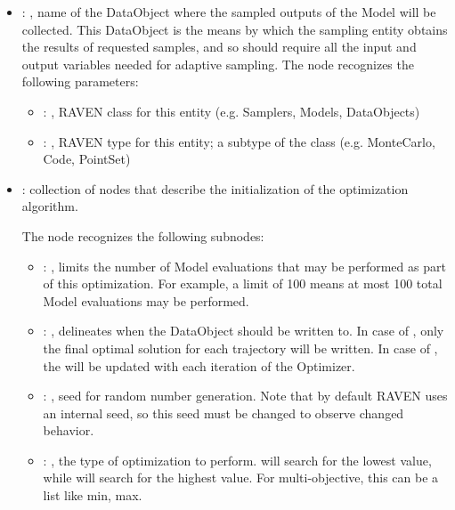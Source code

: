 \begin{itemize}
    \item {}: ,
      name of the DataObject where the sampled outputs of the Model will be collected.
      This DataObject is the means by which the sampling entity obtains the results of requested
      samples, and so should require all the input and output variables needed for adaptive
      sampling.
      The  node recognizes the following parameters:
        \begin{itemize}
          \item {}: ,
            RAVEN class for this entity (e.g. Samplers, Models, DataObjects)
          \item {}: ,
            RAVEN type for this entity; a subtype of the class (e.g. MonteCarlo, Code, PointSet)
      \end{itemize}

    \item {}:
      collection of nodes that describe the initialization of the optimization algorithm.

      The  node recognizes the following subnodes:
      \begin{itemize}
        \item {}: ,
          limits the number of Model evaluations that may be performed as part of this optimization.
          For example, a limit of 100 means at most 100 total Model evaluations may be performed.

        \item {}: ,
          delineates when the  DataObject should be written to. In case
          of , only the final optimal solution for each trajectory will be written.
          In case of , the  will be updated with each
          iteration               of the Optimizer.

        \item {}: ,
          seed for random number generation. Note that by default RAVEN uses an internal seed,
          so this seed must be changed to observe changed behavior. 

        \item {}: ,
          the type of optimization to perform.  will search for the lowest
           value, while  will search for the highest value.
          For multi-objective, this can be a list like min, max.
      \end{itemize}


\end{itemize}
